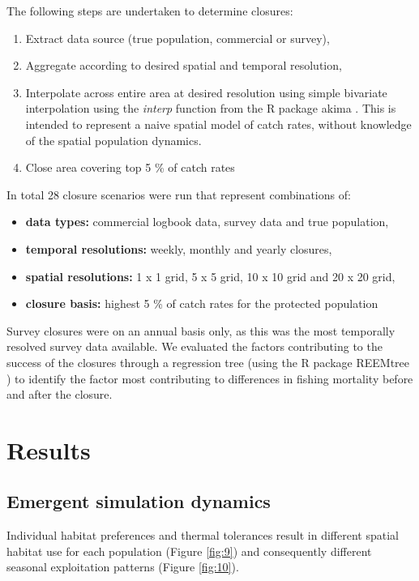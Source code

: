 \documentclass[review]{elsarticle}
\begin{document}
The following steps are undertaken to determine closures:

\begin{enumerate}
	\item Extract data source (true population, commercial or survey), 
	\item Aggregate according to desired spatial and temporal resolution,
	\item Interpolate across entire area at desired resolution using simple
		bivariate interpolation using the \emph{interp} function from
		the R package akima \citep{Akima2006}. This is intended to
		represent a naive spatial model of catch rates, without
		knowledge of the spatial population dynamics.
	\item Close area covering top 5 \% of catch rates 
\end{enumerate}
In total 28 closure scenarios were run that represent combinations of:

\begin{itemize}
	\item \textbf{data types:} commercial logbook data, survey data and
		true population,
	\item \textbf{temporal resolutions:} weekly, monthly and yearly
		closures,
	\item \textbf{spatial resolutions:} 1 x 1 grid, 5 x 5 grid, 10 x 10
		grid and 20 x 20 grid,
	\item \textbf{closure basis:} highest 5 \%  of catch rates for the
		protected population
\end{itemize}

Survey closures were on an annual basis only, as this was the most temporally
resolved survey data available. We evaluated the factors contributing to the
success of the closures through a regression tree (using the R package REEMtree
\citep{Sela2012}) to identify the factor most contributing to differences in
fishing mortality before and after the closure.

\section{Results}

\subsection{Emergent simulation dynamics}

Individual habitat preferences and thermal tolerances result in different
spatial habitat use for each population (Figure \ref{fig:9}) and consequently
different seasonal exploitation patterns (Figure \ref{fig:10}). 
\end{document}
